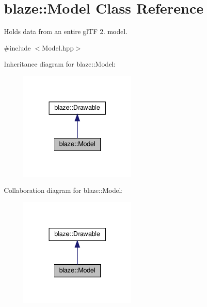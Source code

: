 \hypertarget{classblaze_1_1Model}{}\section{blaze\+:\+:Model Class Reference}
\label{classblaze_1_1Model}


Holds data from an entire gl\+TF 2. model.  




{\ttfamily \#include $<$Model.\+hpp$>$}



Inheritance diagram for blaze\+:\+:Model\+:\nopagebreak
\begin{figure}[H]
\begin{center}
\leavevmode
\includegraphics[width=167pt]{classblaze_1_1Model__inherit__graph}
\end{center}
\end{figure}


Collaboration diagram for blaze\+:\+:Model\+:\nopagebreak
\begin{figure}[H]
\begin{center}
\leavevmode
\includegraphics[width=167pt]{classblaze_1_1Model__coll__graph}
\end{center}
\end{figure}
